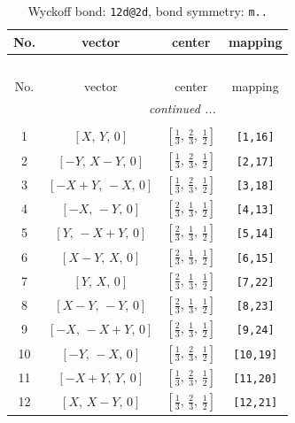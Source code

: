 \documentclass[fleqn,8pt]{jsarticle}
\begin{document}
\begin{longtable}{cccc}
\caption{Wyckoff bond: {\tt 12d@2d}, bond symmetry: {\tt m..}}
 \\
 \hline \hline
No. & vector & center & mapping \\ \hline \endfirsthead

\multicolumn{3}{l}{\tablename\ \thetable{}} \\
 \hline \hline
No. & vector & center & mapping \\ \hline \endhead

 \hline \hline
\multicolumn{3}{r}{\footnotesize\it continued ...} \\ \endfoot

 \hline \hline
\multicolumn{3}{r}{} \\ \endlastfoot

1 & $\left[ X,\, Y,\, 0 \right]$ & $\left[ \frac{1}{3},\, \frac{2}{3},\, \frac{1}{2} \right]$ & {\tt [1,16]} \\ \hline
2 & $\left[ - Y,\, X - Y,\, 0 \right]$ & $\left[ \frac{1}{3},\, \frac{2}{3},\, \frac{1}{2} \right]$ & {\tt [2,17]} \\ \hline
3 & $\left[ - X + Y,\, - X,\, 0 \right]$ & $\left[ \frac{1}{3},\, \frac{2}{3},\, \frac{1}{2} \right]$ & {\tt [3,18]} \\ \hline
4 & $\left[ - X,\, - Y,\, 0 \right]$ & $\left[ \frac{2}{3},\, \frac{1}{3},\, \frac{1}{2} \right]$ & {\tt [4,13]} \\ \hline
5 & $\left[ Y,\, - X + Y,\, 0 \right]$ & $\left[ \frac{2}{3},\, \frac{1}{3},\, \frac{1}{2} \right]$ & {\tt [5,14]} \\ \hline
6 & $\left[ X - Y,\, X,\, 0 \right]$ & $\left[ \frac{2}{3},\, \frac{1}{3},\, \frac{1}{2} \right]$ & {\tt [6,15]} \\ \hline
7 & $\left[ Y,\, X,\, 0 \right]$ & $\left[ \frac{2}{3},\, \frac{1}{3},\, \frac{1}{2} \right]$ & {\tt [7,22]} \\ \hline
8 & $\left[ X - Y,\, - Y,\, 0 \right]$ & $\left[ \frac{2}{3},\, \frac{1}{3},\, \frac{1}{2} \right]$ & {\tt [8,23]} \\ \hline
9 & $\left[ - X,\, - X + Y,\, 0 \right]$ & $\left[ \frac{2}{3},\, \frac{1}{3},\, \frac{1}{2} \right]$ & {\tt [9,24]} \\ \hline
10 & $\left[ - Y,\, - X,\, 0 \right]$ & $\left[ \frac{1}{3},\, \frac{2}{3},\, \frac{1}{2} \right]$ & {\tt [10,19]} \\ \hline
11 & $\left[ - X + Y,\, Y,\, 0 \right]$ & $\left[ \frac{1}{3},\, \frac{2}{3},\, \frac{1}{2} \right]$ & {\tt [11,20]} \\ \hline
12 & $\left[ X,\, X - Y,\, 0 \right]$ & $\left[ \frac{1}{3},\, \frac{2}{3},\, \frac{1}{2} \right]$ & {\tt [12,21]} \\
\end{longtable}
\end{document}
